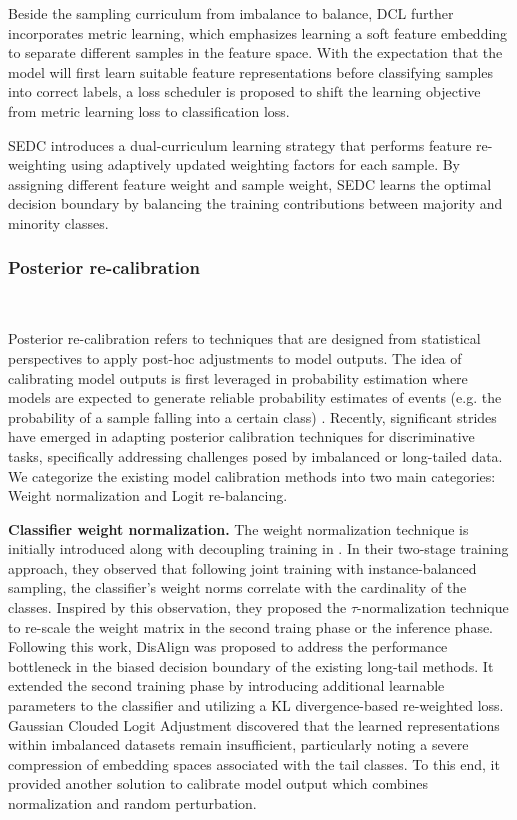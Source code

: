 Beside the sampling curriculum from imbalance to balance, DCL \cite{wang2019dynamic} further incorporates metric learning, which emphasizes learning a soft feature embedding to separate different samples in the feature space. With the expectation that the model will first learn suitable feature representations before classifying samples into correct labels, a loss scheduler is proposed to shift the learning objective from metric learning loss to classification loss.

SEDC \cite{zhao2022diagnosing} introduces a dual-curriculum learning strategy that performs feature re-weighting using adaptively updated weighting factors for each sample. By assigning different feature weight and sample weight, SEDC learns the optimal decision boundary by balancing the training contributions between majority and minority classes.



\subsubsection{Posterior re-calibration}\
\label{s334}

Posterior re-calibration refers to techniques that are designed from statistical perspectives to apply post-hoc adjustments to model outputs. The idea of calibrating model outputs is first leveraged in probability estimation where models are expected to generate reliable probability estimates of events (e.g. the probability of a sample falling into a certain class) \cite{wallace2012class}. Recently, significant strides have emerged in adapting posterior calibration techniques for discriminative tasks, specifically addressing challenges posed by imbalanced or long-tailed data. We categorize the existing model calibration methods into two main categories: Weight normalization and Logit re-balancing.

\textbf{Classifier weight normalization.} The weight normalization technique is initially introduced along with decoupling training in \cite{kang2019decoupling}. In their two-stage training approach, they observed that following joint training with instance-balanced sampling, the classifier's weight norms correlate with the cardinality of the classes. Inspired by this observation, they proposed the $\tau$-normalization technique to re-scale the weight matrix in the second traing phase or the inference phase. Following this work, DisAlign \cite{zhang2021disalign} was proposed to address the performance bottleneck in the biased decision boundary of the existing long-tail methods. It extended the second training phase by introducing additional learnable parameters to the classifier and utilizing a KL divergence-based re-weighted loss. Gaussian Clouded Logit Adjustment \cite{li2022long} discovered that the learned representations within imbalanced datasets remain insufficient, particularly noting a severe compression of embedding spaces associated with the tail classes. To this end, it provided another solution to calibrate model output which combines normalization and random perturbation.


